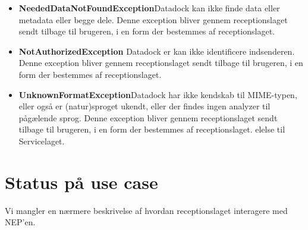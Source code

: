\documentclass{article}
\begin{document}
\begin{itemize}
\item \textbf{NeededDataNotFoundException}\newline Datadock kan ikke
  finde data eller metadata eller begge dele. Denne exception bliver
  gennem receptionslaget sendt tilbage til brugeren, i en form der
  bestemmes af receptionslaget.

\item \textbf{NotAuthorizedException}\newline
  Datadock er kan ikke identificere indsenderen. Denne exception bliver
  gennem receptionslaget sendt tilbage til brugeren, i en form der
  bestemmes af receptionslaget.

\item \textbf{UnknownFormatException}\newline Datadock har ikke
  kendskab til MIME-typen, eller også er (natur)sproget ukendt, eller
  der findes ingen analyzer til pågælende sprog. Denne exception bliver
  gennem receptionslaget sendt tilbage til brugeren, i en form der
  bestemmes af receptionslaget.
elelse til Servicelaget.
\end{itemize}

\section{Status på use case}

Vi mangler en nærmere beskrivelse af hvordan receptionslaget interagere med NEP'en.
\end{document}
